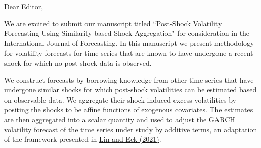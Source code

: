 \documentclass[11pt]{article}
\begin{document}
\footnotesize

\normalsize 


Dear Editor,

We are excited to submit our manuscript titled ``Post-Shock Volatility Forecasting Using Similarity-based Shock Aggregation" for consideration in the International Journal of Forecasting. %
In this manuscript we present methodology for volatility forecasts for time series that are known to have undergone a recent shock for which no post-shock data is observed. 

We construct forecasts by borrowing knowledge from other time series that have undergone similar shocks for which post-shock volatilities can be estimated based on observable data. We aggregate their shock-induced excess volatilities by positing the shocks to be affine functions of exogenous covariates. The estimates are then aggregated into a scalar quantity and used to adjust the GARCH volatility forecast of the time series under study by additive terms, an adaptation of the framework presented in \href{https://doi.org/10.1016/j.ijforecast.2021.03.010}{Lin and Eck (2021)}.
\end{document}

